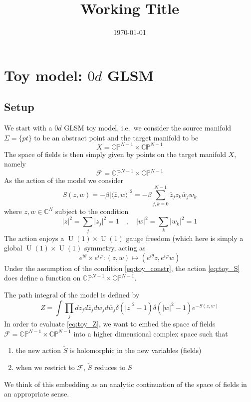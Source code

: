 \documentclass[a4paper,11pt]{article}
\title{Working Title}
\author{}
\date{\today}
\theoremstyle{definition}
\newcommand{\CC}{\mathbb{C}}
\newcommand{\CP}{\mathbb{CP}}
\DeclareMathOperator{\U}{U}
\newcommand{\F}{\mathcal{F}}
\begin{document}
\maketitle

\tableofcontents

\section{Toy model: \texorpdfstring{$0d$ GLSM}{0d GLSM}}
\subsection{Setup}
We start with a $0d$ GLSM toy model, i.e.\ we consider the source manifold $\Sigma = \{ pt \}$ to be an abstract point and the target manifold to be $$X = \CP^{N-1} \times \CP^{N-1}$$
The space of fields is then simply given by points on the target manifold $X$, namely 
\begin{equation}
  \F = \CP^{N-1} \times \CP^{N-1}
\end{equation}
As the action of the model we consider 
\begin{equation}
  S(z,w) = -\beta \lvert \langle \bar z, w\rangle \rvert^2 = -\beta \sum_{j,k = 0}^{N-1} \bar z_j z_k \bar w_j w_k 
  \label{eq:toy_S}
\end{equation}
where $z,w \in \CC^{N}$ subject to the condition 
\begin{equation}
  \lvert z \rvert^2 = \sum_j \lvert z_j \rvert^2 = 1 \quad , \quad \lvert w \rvert^2 = \sum_k \lvert w_k \rvert^2 = 1
  \label{eq:toy_constr}
\end{equation}
The action enjoys a $\U(1) \times \U(1)$ gauge freedom (which here is simply a global $\U(1) \times \U(1)$ symmetry, acting as 
\begin{equation}
  e^{i\theta}\times e^{i\varphi}\colon (z,w) \mapsto (e^{i\theta} z, e^{i\varphi} w)
\end{equation}
Under the assumption of the condition \eqref{eq:toy_constr}, the action \eqref{eq:toy_S} does define a function on $\CP^{N-1} \times \CP^{N-1}$.

The path integral of the model is defined by 
\begin{equation}
  Z = \int \prod_j dz_j d\bar z_j dw_j d\bar w_j \delta(\lvert z \rvert^2  - 1)\delta(\lvert w \rvert^2 -1)  e^{-S(z,w)}
  \label{eq:toy_Z}
\end{equation}
In order to evaluate \eqref{eq:toy_Z}, we want to embed the space of fields $\mathcal F = \CP^{N-1} \times \CP^{N-1}$ into a higher dimensional complex space such that 
\begin{enumerate}
  \item the new action $\tilde S$ is holomorphic in the new variables (fields)
  \item when we restrict to $\mathcal F$, $\tilde S$ reduces to $S$
\end{enumerate}
We think of this embedding as an analytic continuation of the space of fields in an appropriate sense.
\end{document}
